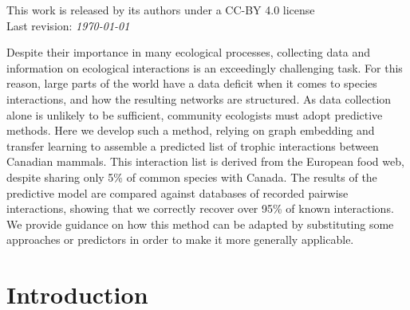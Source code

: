 \documentclass[11pt]{article}
\begin{document}
\vfill
This work is released by its authors under a CC-BY 4.0 license\hfill\ccby\\
Last revision: \emph{\today}

\clearpage
\thispagestyle{empty}

\vfill
Despite their importance in many ecological processes, collecting data
and information on ecological interactions is an exceedingly challenging
task. For this reason, large parts of the world have a data deficit when
it comes to species interactions, and how the resulting networks are
structured. As data collection alone is unlikely to be sufficient,
community ecologists must adopt predictive methods. Here we develop such
a method, relying on graph embedding and transfer learning to assemble a
predicted list of trophic interactions between Canadian mammals. This
interaction list is derived from the European food web, despite sharing
only 5\% of common species with Canada. The results of the predictive
model are compared against databases of recorded pairwise interactions,
showing that we correctly recover over 95\% of known interactions. We
provide guidance on how this method can be adapted by substituting some
approaches or predictors in order to make it more generally applicable.



\vfill

\clearpage
\linenumbers
\pagestyle{normal}

\hypertarget{introduction}{%
\section{Introduction}\label{introduction}}
\end{document}
